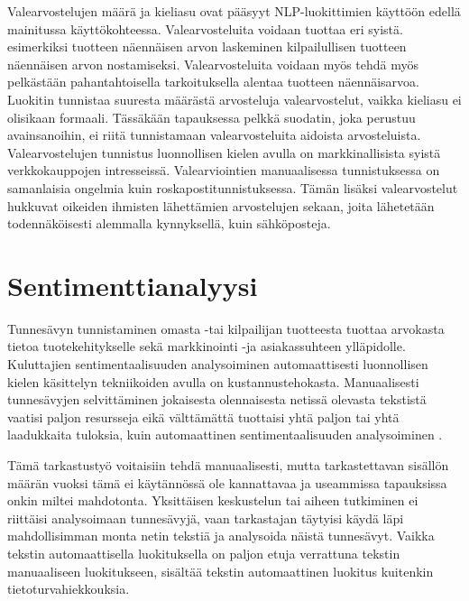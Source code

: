 Valearvostelujen määrä ja kieliasu ovat pääsyyt NLP-luokittimien käyttöön edellä mainitussa käyttökohteessa. Valearvosteluita voidaan tuottaa eri syistä. esimerkiksi tuotteen näennäisen arvon laskeminen kilpailullisen tuotteen näennäisen arvon nostamiseksi.  Valearvosteluita voidaan myös tehdä myös pelkästään pahantahtoisella tarkoituksella alentaa tuotteen näennäisarvoa. Luokitin tunnistaa suuresta määrästä arvosteluja valearvostelut, vaikka kieliasu ei olisikaan formaali. Tässäkään tapauksessa pelkkä suodatin, joka perustuu avainsanoihin, ei riitä tunnistamaan valearvosteluita aidoista arvosteluista. Valearvostelujen tunnistus luonnollisen kielen avulla on markkinallisista syistä verkkokauppojen intresseissä. Valearviointien manuaalisessa tunnistuksessa on samanlaisia ongelmia kuin roskapostitunnistuksessa. Tämän lisäksi valearvostelut hukkuvat oikeiden ihmisten lähettämien arvostelujen sekaan, joita lähetetään todennäköisesti alemmalla kynnyksellä, kuin sähköposteja.

\section{Sentimenttianalyysi}

Tunnesävyn tunnistaminen omasta -tai kilpailijan tuotteesta tuottaa arvokasta tietoa tuotekehitykselle sekä markkinointi -ja asiakassuhteen ylläpidolle. Kuluttajien sentimentaalisuuden analysoiminen automaattisesti luonnollisen kielen käsittelyn tekniikoiden avulla on kustannustehokasta. Manuaalisesti tunnesävyjen selvittäminen jokaisesta olennaisesta netissä olevasta tekstistä vaatisi paljon resursseja eikä välttämättä tuottaisi yhtä paljon tai yhtä laadukkaita tuloksia, kuin automaattinen sentimentaalisuuden analysoiminen \citep{sentimentality}.

Tämä tarkastustyö voitaisiin tehdä manuaalisesti, mutta tarkastettavan sisällön määrän vuoksi tämä ei käytännössä ole kannattavaa ja useammissa tapauksissa onkin miltei mahdotonta. Yksittäisen keskustelun tai aiheen tutkiminen ei riittäisi analysoimaan tunnesävyjä, vaan tarkastajan täytyisi käydä läpi mahdollisimman monta netin tekstiä ja analysoida näistä tunnesävyt. Vaikka tekstin automaattisella luokituksella on paljon etuja verrattuna tekstin manuaaliseen luokitukseen, sisältää tekstin automaattinen luokitus kuitenkin tietoturvahiekkouksia.